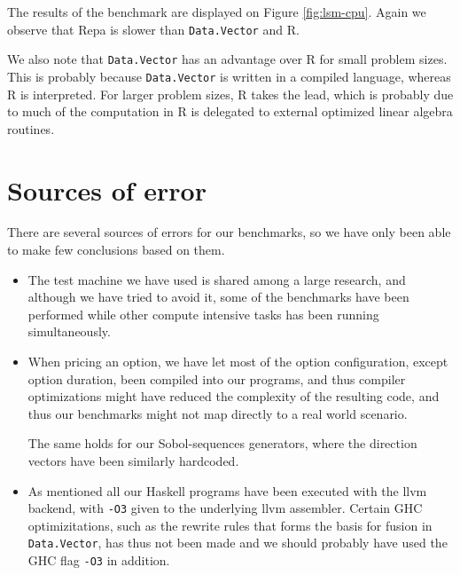   


The results of the benchmark are displayed on Figure
\ref{fig:lsm-cpu}.  Again we observe that Repa is slower than
\lstinline{Data.Vector} and R.

We also note that \lstinline{Data.Vector} has an advantage over R for
small problem sizes. This is probably because \lstinline{Data.Vector}
is written in a compiled language, whereas R is interpreted. For
larger problem sizes, R takes the lead, which is probably due to much
of the computation in R is delegated to external optimized linear
algebra routines.

\section{Sources of error}
There are several sources of errors for our benchmarks, so we have
only been able to make few conclusions based on them.
\begin{itemize}
\item The test machine we have used is shared among a large research,
  and although we have tried to avoid it, some of the benchmarks have
  been performed while other compute intensive tasks has been running
  simultaneously.
\item When pricing an option, we have let most of the option
  configuration, except option duration, been compiled into our
  programs, and thus compiler optimizations might have reduced the
  complexity of the resulting code, and thus our benchmarks might not
  map directly to a real world scenario.

  The same holds for our Sobol-sequences generators, where the
  direction vectors have been similarly hardcoded.
\item As mentioned all our Haskell programs have been executed with
  the llvm backend, with \lstinline{-O3} given to the underlying llvm
  assembler. Certain GHC optimizitations, such as the rewrite rules
  that forms the basis for fusion in \lstinline{Data.Vector}, has thus
  not been made and we should probably have used the GHC flag \lstinline{-O3} in
  addition.
\end{itemize}


